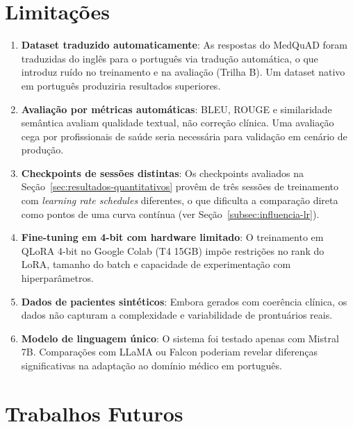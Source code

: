 \section{Limitações}
\label{sec:limitacoes}

\begin{enumerate}
    \item \textbf{Dataset traduzido automaticamente}: As respostas do MedQuAD foram traduzidas do inglês para o português via tradução automática, o que introduz ruído no treinamento e na avaliação (Trilha B). Um dataset nativo em português produziria resultados superiores.

    \item \textbf{Avaliação por métricas automáticas}: BLEU, ROUGE e similaridade semântica avaliam qualidade textual, não correção clínica. Uma avaliação cega por profissionais de saúde seria necessária para validação em cenário de produção.

    \item \textbf{Checkpoints de sessões distintas}: Os checkpoints avaliados na Seção~\ref{sec:resultados-quantitativos} provêm de três sessões de treinamento com \textit{learning rate schedules} diferentes, o que dificulta a comparação direta como pontos de uma curva contínua (ver Seção~\ref{subsec:influencia-lr}).

    \item \textbf{Fine-tuning em 4-bit com hardware limitado}: O treinamento em QLoRA 4-bit no Google Colab (T4 15GB) impõe restrições no rank do LoRA, tamanho do batch e capacidade de experimentação com hiperparâmetros.

    \item \textbf{Dados de pacientes sintéticos}: Embora gerados com coerência clínica, os dados não capturam a complexidade e variabilidade de prontuários reais.

    \item \textbf{Modelo de linguagem único}: O sistema foi testado apenas com Mistral 7B. Comparações com LLaMA ou Falcon poderiam revelar diferenças significativas na adaptação ao domínio médico em português.
\end{enumerate}

\section{Trabalhos Futuros}
\label{sec:trabalhos-futuros}

